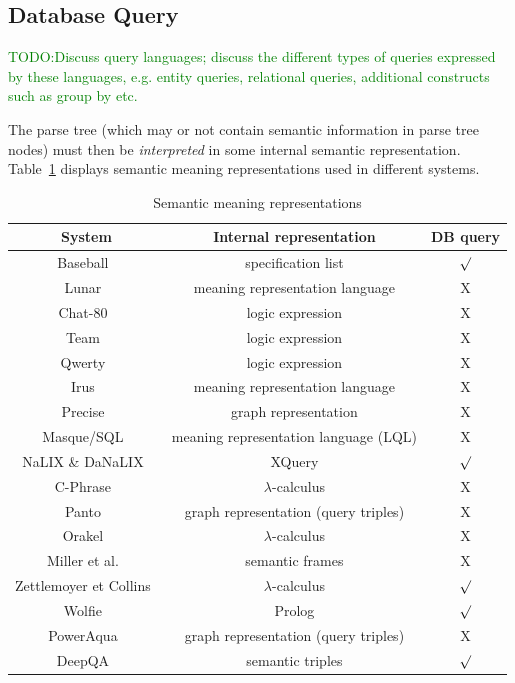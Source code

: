 \documentclass[10pt,journal,letterpaper,compsoc]{IEEEtran}
\newcommand{\TODO}[1]{{\textcolor{green}{TODO:#1}}}
\begin{document}
\subsection{Database Query}
\label{sec:big-picture-semantic}
\TODO{Discuss query languages; discuss the different types of queries expressed by these languages, e.g. entity queries, relational queries, additional constructs such as group by etc.}


The parse tree (which may or not contain semantic information in parse tree
nodes) must then be {\it interpreted} in some internal semantic representation.
Table~\ref{tab:semantic-meaning-representation} displays semantic meaning
representations used in different systems.
\begin{table}[!h]
\centering
\begin{tabular}{|c|c|c|}\hline
{\bf System} & {\bf Internal representation} & {\bf DB query}\\\hline\hline
{\sc Baseball}~\cite{Green:1961:BAQ:1460690.1460714} & specification list &
$\surd$\\\hline
{\sc Lunar}~\cite{Woods:1973:PNL:1499586.1499695} & meaning representation
language & X\\\hline 
{\sc Chat-80}~\cite{Warren:1982:EEA:972942.972944} &
logic expression & X\\\hline
{\sc Team}~\cite{Grosz:1987:TED:25672.25674} & logic expression & X\\\hline
{\sc Qwerty}~\cite{Nelken:2000:QTD:992730.992808} & logic expression & X\\\hline
{\sc Irus}~\cite{Bates:1983:IRU:511793.511804} & meaning representation language
& X\\\hline
{\sc Precise}~\cite{Popescu:2003:TTN:604045.604070} & graph representation &
X\\\hline
{\sc Masque/SQL}~\cite{Androutsopoulos93masque} & meaning representation
language (LQL) & X \\\hline 
{\sc NaLIX} \& {\sc
DaNaLIX}~\cite{Li:2005:NIN:1066157.1066281,Li:2007:DDN:1247480.1247643} & XQuery
& $\surd$\\\hline 
{\sc C-Phrase}~\cite{Minock:2010:CSB:1715942.1716190} & $\lambda$-calculus & X
\\\hline
{\sc Panto}~\cite{Wang:2007:PPN:1419662.1419706} & graph representation (query
triples) & X\\\hline 
{\sc Orakel}~\cite{Cimiano:2007:PNL:1216295.1216330} & $\lambda$-calculus &
X\\\hline
Miller et al.~\cite{Miller:1996:FSA:981863.981871} &
semantic frames & X\\\hline 
Zettlemoyer et
Collins~\cite{DBLP:conf/uai/ZettlemoyerC05} & $\lambda$-calculus &
$\surd$\\\hline 
{\sc Wolfie}~\cite{Thompson:2003:AWM:1622420.1622421} & Prolog & $\surd$
\\\hline {\sc PowerAqua}~\cite{DBLP:conf/esws/LopezMU06} & graph representation
(query triples) & X\\\hline
{\sc DeepQA}~\cite{FerrucciBCFGKLMNPSW10} & semantic triples & $\surd$\\\hline
\end{tabular}
\caption{Semantic meaning representations}
\label{tab:semantic-meaning-representation}
\end{table}
\end{document}
